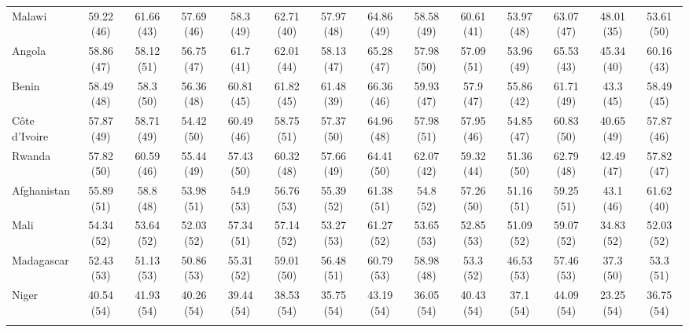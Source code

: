 {\begin{longtable}{lccccccccccccc}
Malawi & 59.22 (46) & 61.66 (43) & 57.69 (46) & 58.3 (49) & 62.71 (40) & 57.97 (48) & 64.86 (49) & 58.58 (49) & 60.61 (41) & 53.97 (48) & 63.07 (47) & 48.01 (35) & 53.61 (50) \\ 
Angola & 58.86 (47) & 58.12 (51) & 56.75 (47) & 61.7 (41) & 62.01 (44) & 58.13 (47) & 65.28 (47) & 57.98 (50) & 57.09 (51) & 53.96 (49) & 65.53 (43) & 45.34 (40) & 60.16 (43) \\ 
Benin & 58.49 (48) & 58.3 (50) & 56.36 (48) & 60.81 (45) & 61.82 (45) & 61.48 (39) & 66.36 (46) & 59.93 (47) & 57.9 (47) & 55.86 (42) & 61.71 (49) & 43.3 (45) & 58.49 (45) \\ 
Côte d'Ivoire & 57.87 (49) & 58.71 (49) & 54.42 (50) & 60.49 (46) & 58.75 (51) & 57.37 (50) & 64.96 (48) & 57.98 (51) & 57.95 (46) & 54.85 (47) & 60.83 (50) & 40.65 (49) & 57.87 (46) \\ 
Rwanda & 57.82 (50) & 60.59 (46) & 55.44 (49) & 57.43 (50) & 60.32 (48) & 57.66 (49) & 64.41 (50) & 62.07 (42) & 59.32 (44) & 51.36 (50) & 62.79 (48) & 42.49 (47) & 57.82 (47) \\ 
Afghanistan & 55.89 (51) & 58.8 (48) & 53.98 (51) & 54.9 (53) & 56.76 (53) & 55.39 (52) & 61.38 (51) & 54.8 (52) & 57.26 (50) & 51.16 (51) & 59.25 (51) & 43.1 (46) & 61.62 (40) \\ 
Mali & 54.34 (52) & 53.64 (52) & 52.03 (52) & 57.34 (51) & 57.14 (52) & 53.27 (53) & 61.27 (52) & 53.65 (53) & 52.85 (53) & 51.09 (52) & 59.07 (52) & 34.83 (52) & 52.03 (52) \\ 
Madagascar & 52.43 (53) & 51.13 (53) & 50.86 (53) & 55.31 (52) & 59.01 (50) & 56.48 (51) & 60.79 (53) & 58.98 (48) & 53.3 (52) & 46.53 (53) & 57.46 (53) & 37.3 (50) & 53.3 (51) \\ 
Niger & 40.54 (54) & 41.93 (54) & 40.26 (54) & 39.44 (54) & 38.53 (54) & 35.75 (54) & 43.19 (54) & 36.05 (54) & 40.43 (54) & 37.1 (54) & 44.09 (54) & 23.25 (54) & 36.75 (54) \\ 
\hline \\[-1.8ex]
\end{longtable}
}